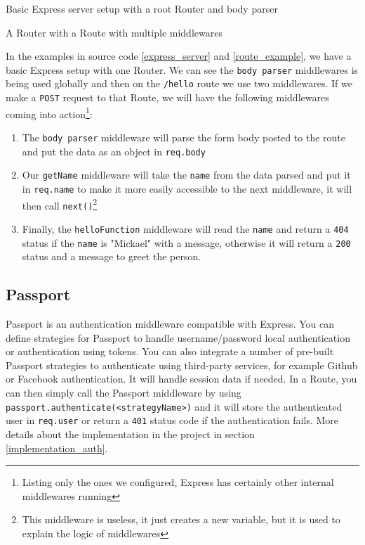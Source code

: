 \documentclass[twoside, openright,11pt,a4paper]{book}
\newenvironment{code}{\captionsetup{type=listing}}{}
\begin{document}
\begin{code}
	\caption{Basic Express server setup with a root Router and body parser}
	\label{express_server}
\end{code}

\begin{code}
	\caption{A Router with a Route with multiple middlewares}
	\label{route_example}
\end{code}

In the examples in source code \ref{express_server} and \ref{route_example}, we have a basic Express setup with one Router. We can see the \verb+body parser+ middlewares is being used globally and then on the \verb+/hello+ route we use two middlewares. If we make a \verb+POST+ request to that Route, we will have the following middlewares coming into action\footnote{Listing only the ones we configured, Express has certainly other internal middlewares running}:
\begin{enumerate}
	\item The \verb+body parser+ middleware will parse the form body posted to the route and put the data as an object in \verb+req.body+
	\item Our \verb+getName+ middleware will take the \verb+name+ from the data parsed and put it in \verb+req.name+ to make it more easily accessible to the next middleware, it will then call \verb+next()+\footnote{This middleware is useless, it just creates a new variable, but it is used to explain the logic of middlewares}
	\item Finally, the \verb+helloFunction+ middleware will read the \verb+name+ and return a \verb+404+\cite{mdn:status:404} status if the \verb+name+ is "Mickael" with a message, otherwise it will return a \verb+200+\cite{mdn:status:200} status and a message to greet the person.
\end{enumerate}

\subsection{Passport}
\label{passport}
Passport\cite{github:passport}\cite{passport:website} is an authentication middleware compatible with Express. You can define strategies for Passport to handle username/password local authentication or authentication using tokens. You can also integrate a number of pre-built Passport strategies to authenticate using third-party services, for example Github or Facebook authentication. It will handle session data if needed. In a Route, you can then simply call the Passport middleware by using \verb+passport.authenticate(<strategyName>)+ and it will store the authenticated user in \verb+req.user+ or return a \verb+401+\cite{mdn:status:401} status code if the authentication fails. More details about the implementation in the project in section \ref{implementation_auth}.
\end{document}
